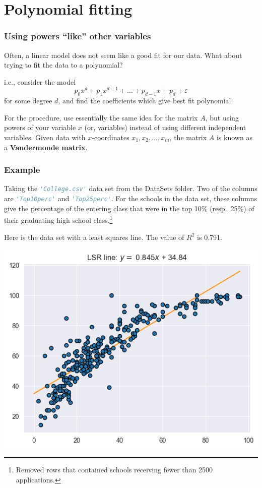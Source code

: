 \documentclass{beamer}
\theoremstyle{example}
\begin{document}
\section{Polynomial fitting}

\begin{frame}
    \frametitle{Using powers ``like'' other variables}
    Often, a linear model does not seem like a good fit for our data. What about trying to fit the data to a polynomial?

    \pause
    i.e., consider the model 
        \[p_0x^d + p_1x^{d-1} + \ldots + p_{d-1}x + p_d + \varepsilon\]
    for some degree $d$, and find the coefficients which give best fit polynomial.
    
    \pause
    For the procedure, use essentially the same idea for the matrix $A$, but using powers of your variable $x$ (or, variables) instead of using different independent variables. Given data with $x$-coordinates $x_1,x_2,\ldots,x_m$, the matrix $A$ is known as a \textbf{Vandermonde matrix}.
    
    \vfill
\end{frame}

\begin{frame}
\frametitle{Example}
Taking the \lstinline[language=Python, stringstyle=\ttfamily\color{strings}]{'College.csv'} data set from the DataSets folder. Two of the columns are \lstinline[language=Python, stringstyle=\ttfamily\color{strings}]{'Top10perc'} and \lstinline[language=Python, stringstyle=\ttfamily\color{strings}]{'Top25perc'}. For the schools in the data set, these columns give the percentage of the entering class that were in the top 10\% (resp.\ 25\%) of their graduating high school class.\footnote{Removed rows that contained schools receiving fewer than 2500 applications.}
    

\pause
Here is the data set with a least squares line. The value of $R^2$ is 0.791. 
\begin{center}
    \includegraphics[height=0.35\textheight]{../../Images/CollegeTop25ontoTop10_deg1.png}
\end{center}

\end{frame}
\end{document}
